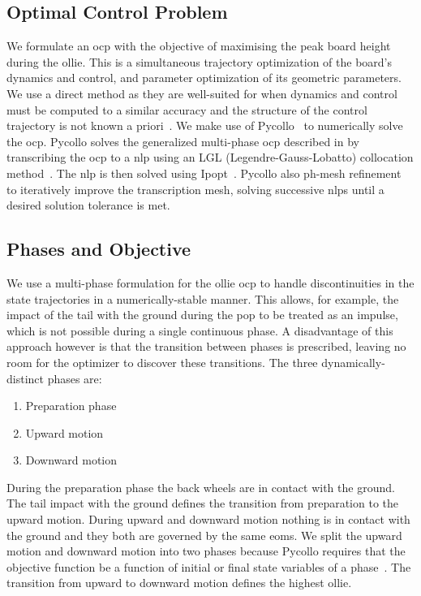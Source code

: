\documentclass[default,iicol]{sn-jnl}
\begin{document}
\subsection{Optimal Control Problem}
We formulate an \gls{ocp} with the objective of maximising the peak board height during the ollie. This is a simultaneous trajectory optimization of the board's dynamics and control, and parameter optimization of its geometric parameters. We use a direct method as they are well-suited for when dynamics and control must be computed to a similar accuracy and the structure of the control trajectory is not known a priori~\cite{kelly_introduction_2017}. We make use of Pycollo~\cite{brockie_predictive_2021} to numerically solve the \gls{ocp}. Pycollo solves the generalized multi-phase \gls{ocp} described in \citet{betts_practical_2010} by transcribing the \gls{ocp} to a \gls{nlp} using an LGL (Legendre-Gauss-Lobatto) collocation method~\cite{betts_using_2016}. The \gls{nlp} is then solved using Ipopt~\cite{biegler_large-scale_2009}. Pycollo also ph-mesh refinement~\cite{patterson_ph_2015} to iteratively improve the transcription mesh, solving successive \glspl{nlp} until a desired solution tolerance is met.

\subsection{Phases and Objective} \label{s_phases}

We use a multi-phase formulation for the ollie \gls{ocp} to handle discontinuities in the state trajectories in a numerically-stable manner. This allows, for example, the impact of the tail with the ground during the pop to be treated as an impulse, which is not possible during a single continuous phase. A disadvantage of this approach however is that the transition between phases is prescribed, leaving no room for the optimizer to discover these transitions. The three dynamically-distinct phases are:
\begin{enumerate} \label{n_phases}
  \item Preparation phase
  \item Upward motion
  \item Downward motion
\end{enumerate}

During the preparation phase the back wheels are in contact with the ground. The tail impact with the ground defines the transition from preparation to the upward motion. During upward and downward motion nothing is in contact with the ground and they both are governed by the same \glspl{eom}. We split the upward motion and downward motion into two phases because Pycollo requires that the objective function be a function of initial or final state variables of a phase~\cite{brockie_predictive_2021}. The transition from upward to downward motion defines the highest ollie.
\end{document}
